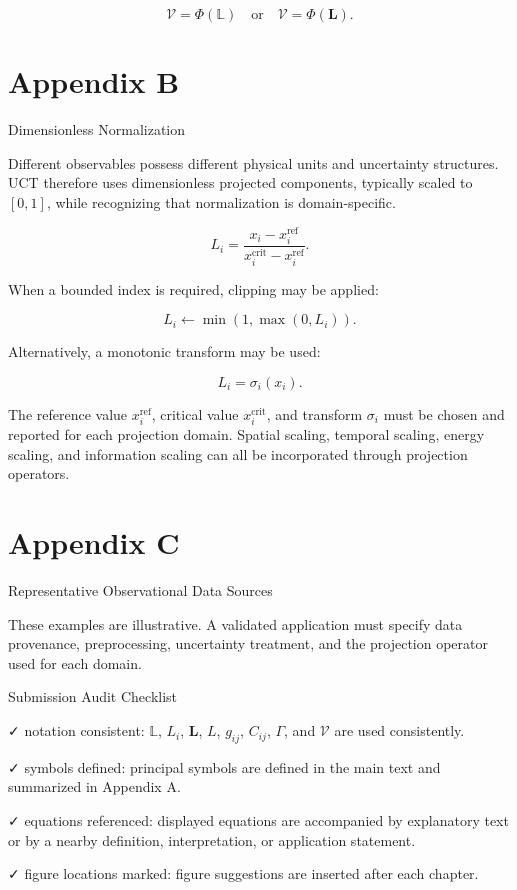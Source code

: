\documentclass[aps,pre,reprint,superscriptaddress,nofootinbib]{revtex4-2}
\begin{document}
\[ \mathcal{V}=\Phi(\mathbb{L}) \quad \text{or} \quad \mathcal{V}=\Phi(\mathbf{L}). \]

\section{Appendix B}

Dimensionless Normalization

Different observables possess different physical units and uncertainty structures. UCT therefore uses dimensionless projected components, typically scaled to \([0,1]\), while recognizing that normalization is domain-specific.

\[ L_i=\frac{x_i-x_i^{\mathrm{ref}}}{x_i^{\mathrm{crit}}-x_i^{\mathrm{ref}}}. \]

When a bounded index is required, clipping may be applied:

\[ L_i\leftarrow \min(1,\max(0,L_i)). \]

Alternatively, a monotonic transform may be used:

\[ L_i=\sigma_i(x_i). \]

The reference value \(x_i^{\mathrm{ref}}\), critical value \(x_i^{\mathrm{crit}}\), and transform \(\sigma_i\) must be chosen and reported for each projection domain. Spatial scaling, temporal scaling, energy scaling, and information scaling can all be incorporated through projection operators.

\section{Appendix C}

Representative Observational Data Sources

These examples are illustrative. A validated application must specify data provenance, preprocessing, uncertainty treatment, and the projection operator used for each domain.

Submission Audit Checklist

✓ notation consistent: \(\mathbb{L}\), \(L_i\), \(\mathbf{L}\), \(L\), \(g_{ij}\), \(C_{ij}\), \(\Gamma\), and \(\mathcal{V}\) are used consistently.

✓ symbols defined: principal symbols are defined in the main text and summarized in Appendix A.

✓ equations referenced: displayed equations are accompanied by explanatory text or by a nearby definition, interpretation, or application statement.

✓ figure locations marked: figure suggestions are inserted after each chapter.
\end{document}
